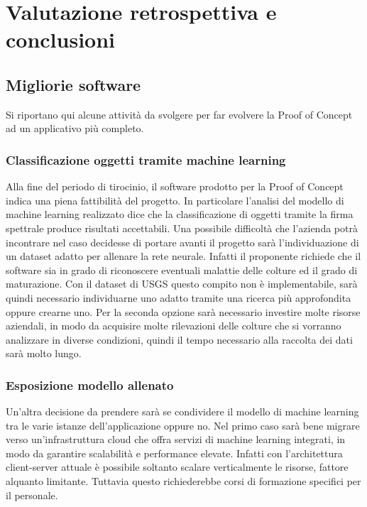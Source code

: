 
\chapter{Valutazione retrospettiva e conclusioni}
\label{cap:conclusione}


\section{Migliorie software}
Si riportano qui alcune attività da svolgere per far evolvere la Proof of Concept ad un applicativo più completo.

\subsection{Classificazione oggetti tramite machine learning}
Alla fine del periodo di tirocinio, il software prodotto per la Proof of Concept indica una piena fattibilità del progetto. In particolare l'analisi del modello di machine learning realizzato dice che la classificazione di oggetti tramite la firma spettrale produce risultati accettabili. Una possibile difficoltà che l'azienda potrà incontrare nel caso decidesse di portare avanti il progetto sarà l'individuazione di un dataset adatto per allenare la rete neurale. Infatti il proponente richiede che il software sia in grado di riconoscere eventuali malattie delle colture ed il grado di maturazione. Con il dataset di USGS questo compito non è implementabile, sarà quindi necessario individuarne uno adatto tramite una ricerca più approfondita oppure crearne uno. Per la seconda opzione sarà necessario investire molte risorse aziendali, in modo da acquisire molte rilevazioni delle colture che si vorranno analizzare in diverse condizioni, quindi il tempo necessario alla raccolta dei dati sarà molto lungo.

\subsection{Esposizione modello allenato}
Un'altra decisione da prendere sarà se condividere il modello di machine learning tra le varie istanze dell'applicazione oppure no. Nel primo caso sarà bene migrare verso un'infrastruttura cloud che offra servizi di machine learning integrati, in modo da garantire scalabilità e performance elevate. Infatti con l'architettura client-server attuale è possibile soltanto scalare verticalmente le risorse, fattore alquanto limitante. Tuttavia questo richiederebbe corsi di formazione specifici per il personale.

